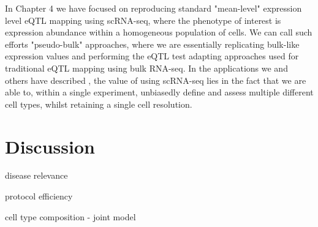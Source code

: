 In Chapter 4 we have focused on reproducing standard "mean-level" expression level eQTL mapping using scRNA-seq, where the phenotype of interest is expression abundance within a homogeneous population of cells.
We can call such efforts "pseudo-bulk" approaches, where we are essentially replicating bulk-like expression values and performing the eQTL test adapting approaches used for traditional eQTL mapping using bulk RNA-seq. 
In the applications we and others have described \cite{van2018single,cuomo2020single}, the value of using scRNA-seq lies in the fact that we are able to, within a single experiment, unbiasedly define and assess multiple different cell types, whilst retaining a single cell resolution.\\



\section{Discussion}

disease relevance

protocol efficiency

cell type composition - joint model